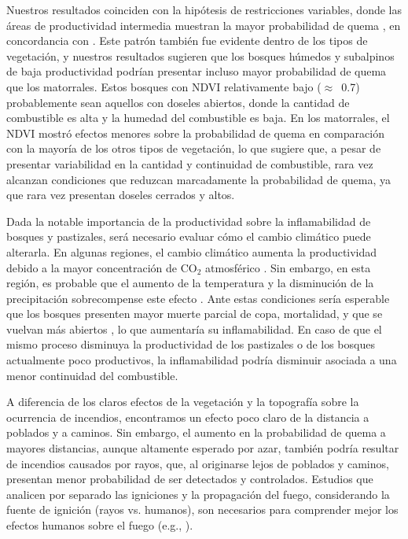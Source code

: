 Nuestros resultados coinciden con la hipótesis de restricciones variables, donde las áreas de productividad intermedia muestran la mayor probabilidad de quema \citep{pausas_global_2013, krawchuk_constraints_2011}, en concordancia con \citet{kitzberger_projections_2022}. Este patrón también fue evidente dentro de los tipos de vegetación, y nuestros resultados sugieren que los bosques húmedos y subalpinos de baja productividad podrían presentar incluso mayor probabilidad de quema que los matorrales. Estos bosques con NDVI relativamente bajo ($\approx$~0.7) probablemente sean aquellos con doseles abiertos, donde la cantidad de combustible es alta y la humedad del combustible es baja. En los matorrales, el NDVI mostró efectos menores sobre la probabilidad de quema en comparación con la mayoría de los otros tipos de vegetación, lo que sugiere que, a pesar de presentar variabilidad en la cantidad y continuidad de combustible, rara vez alcanzan condiciones que reduzcan marcadamente la probabilidad de quema, ya que rara vez presentan doseles cerrados y altos. 

Dada la notable importancia de la productividad sobre la inflamabilidad de bosques y pastizales, será necesario evaluar cómo el cambio climático puede alterarla. En algunas regiones, el cambio climático aumenta la productividad debido a la mayor concentración de $\text{CO}_2$ atmosférico \citep{silva2013probing,sperlich2020gains}. Sin embargo, en esta región, es probable que el aumento de la temperatura y la disminución de la precipitación sobrecompense este efecto \citep{gutierrez2014increased}. Ante estas condiciones sería esperable que los bosques presenten mayor muerte parcial de copa, mortalidad, y que se vuelvan más abiertos  \citep{suarez2004factors,rodriguez2016influence,molowny2017changes}, lo que aumentaría su inflamabilidad. En caso de que el mismo proceso disminuya la productividad de los pastizales o de los bosques actualmente poco productivos, la inflamabilidad podría disminuir asociada a una menor continuidad del combustible.

A diferencia de los claros efectos de la vegetación y la topografía sobre la ocurrencia de incendios, encontramos un efecto poco claro de la distancia a poblados y a caminos. Sin embargo, el aumento en la probabilidad de quema a mayores distancias, aunque altamente esperado por azar, también podría resultar de incendios causados por rayos, que, al originarse lejos de poblados y caminos, presentan menor probabilidad de ser detectados y controlados. Estudios que analicen por separado las igniciones y la propagación del fuego, considerando la fuente de ignición (rayos vs. humanos), son necesarios para comprender mejor los efectos humanos sobre el fuego (e.g., \citealt{mundo_environmental_2013, morales_stochastic_2015, godoy_forty_2022}).

